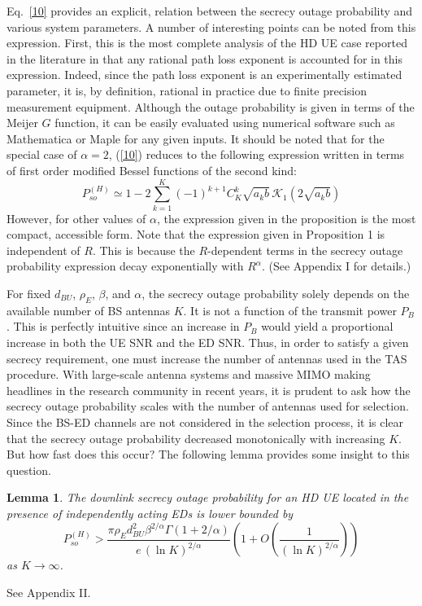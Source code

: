 \documentclass[10pt]{IEEEtran}
\newtheorem{lem}[thm]{Lemma}
\begin{document}
Eq.~\eqref{10} provides an explicit, relation between the secrecy outage probability and various system parameters.  A number of interesting points can be noted from this expression.  First, this is the most complete analysis of the HD UE case reported in the literature in that any rational path loss exponent is accounted for in this expression.  Indeed, since the path loss exponent is an experimentally estimated parameter, it is, by definition, rational in practice due to finite precision measurement equipment.  Although the outage probability is given in terms of the Meijer $G$ function, it can be easily evaluated using numerical software such as Mathematica or Maple for any given inputs.  It should be noted that for the special case of $\alpha = 2$, (\ref{10}) reduces to the following expression written in terms of first order modified Bessel functions of the second kind:
\begin{equation}
  P^{(H)}_{so} \simeq1- 2\sum_{k=1}^K(-1)^{k+1}C^k_K \sqrt{a_k b}\, \mathcal K_1\!\left(2 \sqrt{a_k b}\right)
\end{equation}
However, for other values of $\alpha$, the expression given in the proposition is the most compact, accessible form. Note that the expression given in Proposition 1 is independent of $R$. This is because the $R$-dependent terms in the secrecy outage probability expression decay exponentially with $R^\alpha$. (See Appendix I for details.)

For fixed $d_{BU}$, $\rho_E$, $\beta$, and $\alpha$, the secrecy outage probability solely depends on the available number of BS antennas $K$.  It is not a function of the transmit power $P_B$.  This is perfectly intuitive since an increase in $P_B$ would yield a proportional increase in both the UE SNR and the ED SNR.  Thus, in order to satisfy a given secrecy requirement, one must increase the number of antennas used in the TAS procedure.  With large-scale antenna systems and massive MIMO making headlines in the research community in recent years, it is prudent to ask how the secrecy outage probability scales with the number of antennas used for selection.  Since the BS-ED channels are not considered in the selection process, it is clear that the secrecy outage probability decreased monotonically with increasing $K$.  But how fast does this occur?  The following lemma provides some insight to this question.

\begin{lem}
  The downlink secrecy outage probability for an HD UE located in the presence of independently acting EDs is lower bounded by
\begin{equation}
  P_{so}^{(H)} > \frac{\pi \rho_E d_{BU}^2 \beta^{2/\alpha}\Gamma(1+2/\alpha)}{e \,(\ln K)^{2/\alpha}}\left(1 + O\!\left(\frac{1}{(\ln K)^{2/\alpha}}\right)\right)
\end{equation}
as $K\to\infty$.
\end{lem}
\begin{IEEEproof}
  See Appendix II.
\end{IEEEproof}
\end{document}
